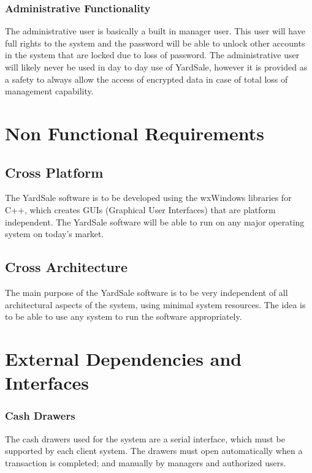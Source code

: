 \documentclass{report}
\begin{document}
    \subsubsection{Administrative Functionality}

    The administrative user is basically a built in manager user. This
    user will have full rights to the system and the password will be
    able to unlock other accounts in the system that are locked due to
    loss of password. The administrative user will likely never be
    used in day to day use of YardSale, however it is provided as a
    safety to always allow the access of encrypted data in case of
    total loss of management capability.

\section{Non Functional Requirements}

    \subsection{Cross Platform}
    The YardSale software is to be developed using the wxWindows libraries for C++,
    which creates GUIs (Graphical User Interfaces) that are
    platform independent.  The YardSale software will be able to
    run on any major operating system on today's market.

    \subsection{Cross Architecture}
    The main purpose of the YardSale software is to be very
    independent of all architectural aspects of the system, using
    minimal system resources.  The idea is to be able to use any system
    to run the software appropriately.

\section{External Dependencies and Interfaces}

    \subsubsection{Cash Drawers}
    The cash drawers used for the system are a serial interface,
    which must be supported by each client system.  The drawers
    must open automatically when a transaction is completed; and
    manually by managers and authorized users.
\end{document}
